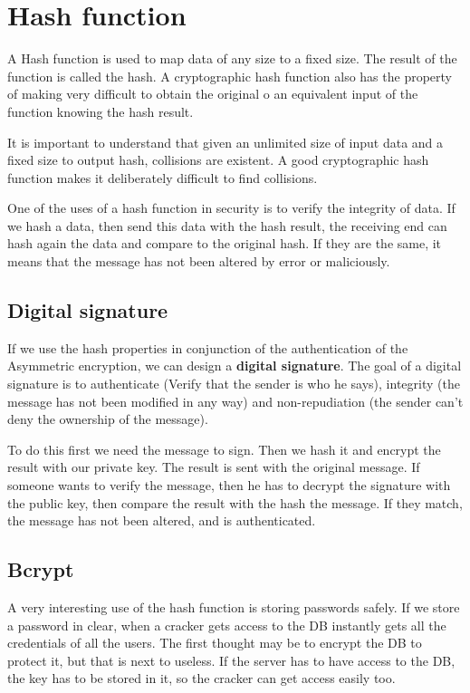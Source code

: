 \section{Hash function}
A Hash function is used to map data of any size to a fixed size. The result of the function is called the hash. A cryptographic hash function also has the property of making very difficult to obtain the original o an equivalent input of the function knowing the hash result.

It is important to understand that given an unlimited size of input data and a fixed size to output hash, collisions are existent. A good cryptographic hash function makes it deliberately difficult to find collisions.

One of the uses of a hash function in security is to verify the integrity of data. If we hash a data, then send this data with the hash result, the receiving end can hash again the data and compare to the original hash. If they are the same, it means that the message has not been altered by error or maliciously.

\subsection{Digital signature}
If we use the hash properties in conjunction of the authentication of the Asymmetric encryption, we can design a \textbf{digital signature}. The goal of a digital signature is to authenticate (Verify that the sender is who he says), integrity (the message has not been modified in any way) and non-repudiation (the sender can't deny the ownership of the message).

To do this first we need the message to sign. Then we hash it and encrypt the result with our private key. The result is sent with the original message. If someone wants to verify the message, then he has to decrypt the signature with the public key, then compare the result with the hash the message. If they match, the message has not been altered, and is authenticated.
 
\subsection{Bcrypt}
A very interesting use of the hash function is storing passwords safely. If we store a password in clear, when a cracker gets access to the DB instantly gets all the credentials of all the users. The first thought may be to encrypt the DB to protect it, but that is next to useless. If the server has to have access to the DB, the key has to be stored in it, so the cracker can get access easily too.

